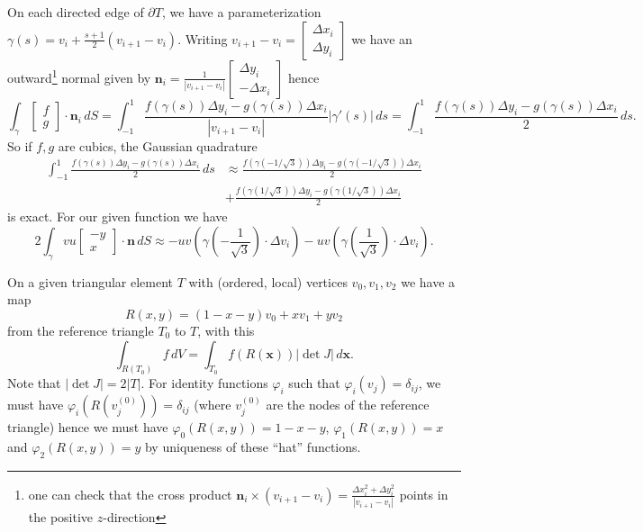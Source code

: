 \documentclass[letterpaper,10pt]{article}
\begin{document}
On each directed edge of \(\partial T\), we have a parameterization
\(\gamma(s) = v_i + \frac{s + 1}{2}(v_{i + 1} - v_i)\). Writing
\(v_{i + 1} - v_i = \left[ \begin{array}{c} \Delta x_i \\ \Delta y_i
\end{array}\right]\) we have an outward\footnote{one can
check that the cross product
\(\mathbf{n}_i \times (v_{i + 1} - v_i) = \frac{\Delta x_i^2 +
\Delta y_i^2}{\left|v_{i + 1} - v_i\right|}\) points in the positive
\(z\)-direction} normal given by
\(\mathbf{n}_i = \frac{1}{\left|v_{i + 1} - v_i\right|} \left[
\begin{array}{c} \Delta y_i \\ -\Delta x_i \end{array}\right]\) hence
\[\int_{\gamma} \left[ \begin{array}{c} f \\ g \end{array}\right]
\cdot \mathbf{n}_i \, dS =
\int_{-1}^1 \frac{f\left(\gamma(s)\right) \Delta y_i -
g\left(\gamma(s)\right) \Delta x_i}{
\left|v_{i + 1} - v_i\right|} \left|\gamma'(s)\right| \, ds =
\int_{-1}^1 \frac{f\left(\gamma(s)\right) \Delta y_i -
g\left(\gamma(s)\right) \Delta x_i}{2} \, ds.\]
So if \(f, g\) are cubics, the Gaussian quadrature
\begin{align*}
\int_{-1}^1 \frac{f\left(\gamma(s)\right) \Delta y_i -
g\left(\gamma(s)\right) \Delta x_i}{2} \, ds &\approx
\frac{f\left(\gamma\left(-1 / \sqrt{3}\right)\right) \Delta y_i -
g\left(\gamma\left(-1 / \sqrt{3}\right)\right) \Delta x_i}{2} \\
&+ \frac{f\left(\gamma\left(1 / \sqrt{3}\right)\right) \Delta y_i -
g\left(\gamma\left(1 / \sqrt{3}\right)\right) \Delta x_i}{2}
\end{align*}
is exact. For our given function we have
\[2\int_{\gamma} vu \left[ \begin{array}{c} -y \\ x \end{array}\right]
\cdot \mathbf{n} \, dS \approx
-uv \left(\gamma\left(-\frac{1}{\sqrt{3}}\right)
\cdot \Delta v_i\right)
- uv \left(\gamma\left(\frac{1}{\sqrt{3}}\right)
\cdot \Delta v_i\right).\]

On a given triangular element \(T\) with (ordered, local) vertices
\(v_0, v_1, v_2\) we have a map
\[R(x, y) = (1 - x - y) v_0 + x v_1 + y v_2\]
from the reference triangle \(T_0\) to \(T\), with this
\[\int_{R(T_0)} f \, dV = \int_{T_0} f(R(\mathbf{x}))
\left|\det J\right| \,d \mathbf{x}.\]
Note that \(\left|\det J\right| = 2\left|T\right|\). For identity
functions \(\varphi_i\) such that \(\varphi_i(v_j) = \delta_{ij}\),
we must have \(\varphi_i\left(R\left(v_j^{(0)}\right)\right) =
\delta_{ij}\) (where \(v_j^{(0)}\) are the nodes of the reference
triangle) hence we must have \(\varphi_0\left(R(x, y)\right) = 1 - x - y\),
\(\varphi_1\left(R(x, y)\right) = x\) and
\(\varphi_2\left(R(x, y)\right) = y\) by uniqueness of these ``hat''
functions.
\end{document}
